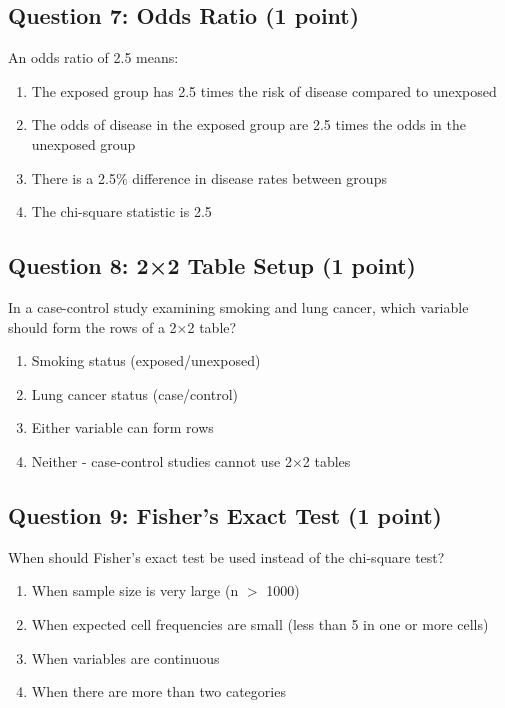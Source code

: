 \documentclass[10pt]{article}
\begin{document}
\subsection*{Question 7: Odds Ratio (1 point)}
An odds ratio of 2.5 means:
\begin{enumerate}[label=\Alph*., leftmargin=20pt]
\item The exposed group has 2.5 times the risk of disease compared to unexposed
\item The odds of disease in the exposed group are 2.5 times the odds in the unexposed group
\item There is a 2.5\% difference in disease rates between groups
\item The chi-square statistic is 2.5
\end{enumerate}

\subsection*{Question 8: 2×2 Table Setup (1 point)}
In a case-control study examining smoking and lung cancer, which variable should form the rows of a 2×2 table?
\begin{enumerate}[label=\Alph*., leftmargin=20pt]
\item Smoking status (exposed/unexposed)
\item Lung cancer status (case/control)
\item Either variable can form rows
\item Neither - case-control studies cannot use 2×2 tables
\end{enumerate}

\subsection*{Question 9: Fisher's Exact Test (1 point)}
When should Fisher's exact test be used instead of the chi-square test?
\begin{enumerate}[label=\Alph*., leftmargin=20pt]
\item When sample size is very large (n $>$ 1000)
\item When expected cell frequencies are small (less than 5 in one or more cells)
\item When variables are continuous
\item When there are more than two categories
\end{enumerate}

\newpage
\end{document}
